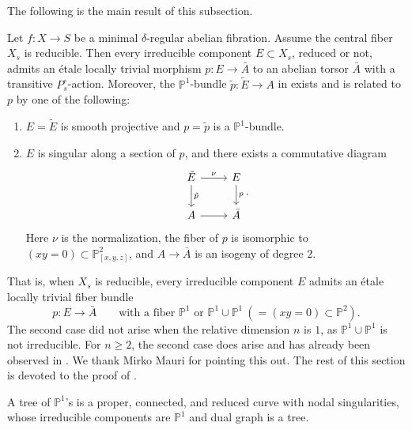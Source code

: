\documentclass[reqno, letterpaper]{amsart}
\numberwithin{equation}{subsection}
\let\to\longrightarrow
\newcommand{\PP}{\mathbb{P}}
\begin{document}
		The following is the main result of this subsection.
		
		\begin{proposition} \label{prop:E}
			Let $f : X \to S$ be a minimal $\delta$-regular abelian fibration. Assume the central fiber $X_s$ is reducible. Then every irreducible component $E \subset X_s$, reduced or not, admits an \'etale locally trivial morphism $p : E \to \bar A$ to an abelian torsor $\bar A$ with a transitive $P^\circ_s$-action. Moreover, the $\PP^1$-bundle $\tilde p : \tilde E \to A$ in  exists and is related to $p$ by one of the following:
			\begin{enumerate}[label = \textnormal{(\roman*)}, ref = \roman*]
				\item $E = \tilde E$ is smooth projective and $p = \tilde p$ is a $\PP^1$-bundle.
				\item $E$ is singular along a section of $p$, and there exists a commutative diagram
				\[\begin{tikzcd}
					\tilde E \arrow[r, "\nu"] \arrow[d, "\tilde p"] & E \arrow[d, "p"] \\
					A \arrow[r] & \bar A
				\end{tikzcd}.\]
				Here $\nu$ is the normalization, the fiber of $p$ is isomorphic to $(xy = 0) \subset \PP^2_{[x,y,z]}$, and $A \to \bar A$ is an isogeny of degree $2$.
			\end{enumerate}
		\end{proposition}
		
		That is, when $X_s$ is reducible, every irreducible component $E$ admits an \'etale locally trivial fiber bundle
		\[ p : E \to \bar A \qquad\mbox{with a fiber } \PP^1 \mbox{ or } \PP^1 \cup \PP^1 \ (= (xy = 0) \subset \PP^2) .\]
		The second case did not arise when the relative dimension $n$ is $1$, as $\PP^1 \cup \PP^1$ is not irreducible. For $n \ge 2$, the second case does arise and has already been observed in \cite[Figure~1]{mat01}. We thank Mirko Mauri for pointing this out. The rest of this section is devoted to the proof of .
		
		\medskip
		
		A tree of $\PP^1$'s is a proper, connected, and reduced curve with nodal singularities, whose irreducible components are $\PP^1$ and dual graph is a tree.
		
\end{document}

